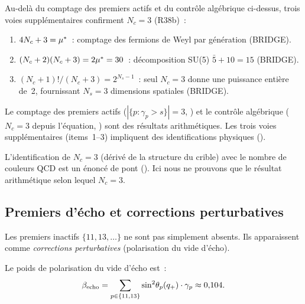 \documentclass[12pt,a4paper]{article}
\begin{document}
\begin{remarque}[Cinq voies indépendantes vers $N_c = 3$]
\label{rem:Nc_routes}
Au-delà du comptage des premiers actifs et du contrôle algébrique
ci-dessus, trois voies supplémentaires confirment $N_c = 3$ (R38b)~:
\begin{enumerate}[nosep]
\item $4N_c + 3 = {\mu^{*}}$~: comptage des fermions de Weyl par
  génération (BRIDGE).
\item $(N_c + 2)(N_c + 3) = 2{\mu^{*}} = 30$~: décomposition SU(5)
  $\bar{5} + 10 = 15$ (BRIDGE).
\item $(N_c + 1)!/(N_c + 3) = 2^{N_s - 1}$~: seul $N_c = 3$ donne
  une puissance entière de~2, fournissant $N_s = 3$ dimensions
  spatiales (BRIDGE).
\end{enumerate}
Le comptage des premiers actifs ($|\{p : \gamma_p > s\}| = 3$,
\THMTAG) et le contrôle algébrique ($N_c = 3$ depuis l'équation,
\THMTAG) sont des résultats arithmétiques. Les trois voies
supplémentaires (items~1--3) impliquent des identifications
physiques (\BRIDGETAG).
\end{remarque}

\begin{remarque}
L'identification de $N_c = 3$ (dérivé de la structure du crible) avec
le nombre de couleurs QCD est un énoncé de pont
(\cite{companion_M5}). Ici nous ne prouvons que le résultat
arithmétique selon lequel $N_c = 3$.
\end{remarque}

\subsection{Premiers d'écho et corrections perturbatives}
\label{sec:ghost}

Les premiers inactifs $\{11, 13, \ldots\}$ ne sont pas simplement
absents. Ils apparaissent comme \emph{corrections perturbatives}
(polarisation du vide d'écho).

\begin{definition}
\label{def:ghost_vp}
Le poids de polarisation du vide d'écho est~:
\begin{equation}
  \beta_{\rm echo} = \sum_{p \in \{11,13\}} \sin^2\!\theta_{p}(q_{+}) \cdot \gamma_p
  \approx 0{,}104.
  \label{eq:ghost_vp:ch06}
\end{equation}
\end{definition}
\end{document}
